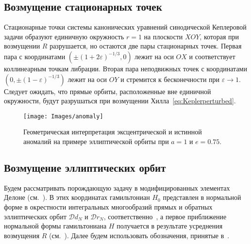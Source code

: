 \documentclass[14pt,a4paper%
]{extarticle}
\begin{document}
\subsection{Возмущение стационарных точек}
Стационарные точки системы канонических уравнений синодической Кеплеровой задачи образуют единичную окружность $r=1$ на плоскости $XOY$, которая при возмущении $R$ разрушается, но остаются две пары стационарных точек. Первая пара с координатами $\left(\pm(1+2\varepsilon)^{-1/3},0\right)$ лежит на оси $OX$ и соответствует коллинеарным точкам либрации. Вторая пара неподвижных точек с координатами $\left(0,\pm(1-\varepsilon)^{-1/3}\right)$ лежит на оси $OY$ и стремится к бесконечности при $\varepsilon\rightarrow 1$. Следует ожидать, что прямые орбиты, расположенные вне единичной окружности, будут разрушаться при возмущении Хилла~\eqref{eq:Keplerperturbed}.

\begin{figure}[htb]
\centering
\texttt{[image: Images/anomaly]}
\caption{Геометрическая интерпретация эксцентрической и истинной аномалий на примере эллиптической орбиты при $a=1$ и $e=0.75$.}\label{fig:anomaly}
\end{figure}



\subsection{Возмущение эллиптических орбит}
Будем рассматривать порождающую задачу в модифицированных элементах Делоне (см.~\cite[гл.~7]{Szebehely}). В этих координатах гамильтониан $H_0$ представлен в нормальной форме в окрестности интегральных многообразий прямых и обратных эллиптических орбит $\mathcal Dd_N$ и $\mathcal Dr_N$, соответственно~\cite[гл.~VII, \S2]{BrunoRTBP}, а  первое приближение нормальной формы гамильтониана $H$ получается в результате усреднения возмущения $R$ (см.~\cite[п.~4.4]{BrunoLocal}). Далее будем использовать обозначения, принятые в~\cite[гл.~VII]{BrunoRTBP}.
\end{document}
